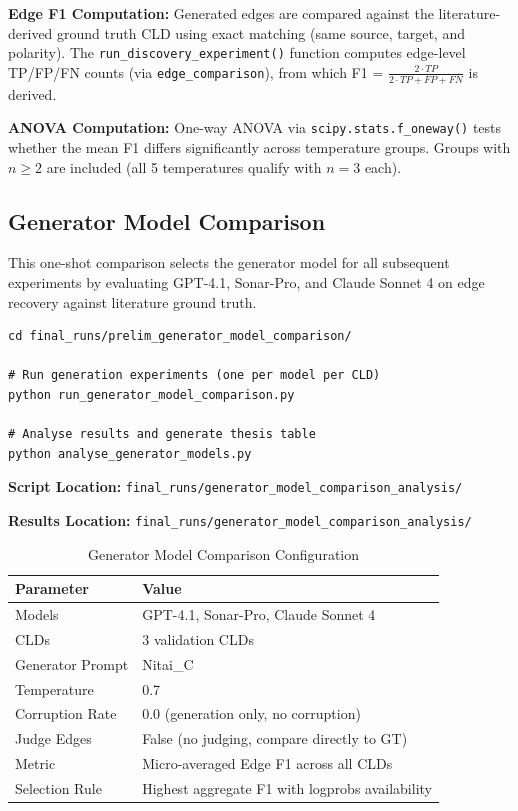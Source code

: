 \textbf{Edge F1 Computation:} Generated edges are compared against the literature-derived ground truth CLD using exact matching (same source, target, and polarity). The \texttt{run\_discovery\_experiment()} function computes edge-level TP/FP/FN counts (via \texttt{edge\_comparison}), from which F1 = $\frac{2 \cdot TP}{2 \cdot TP + FP + FN}$ is derived.

\textbf{ANOVA Computation:} One-way ANOVA via \texttt{scipy.stats.f\_oneway()} tests whether the mean F1 differs significantly across temperature groups. Groups with $n \geq 2$ are included (all 5 temperatures qualify with $n=3$ each).

\subsection{Generator Model Comparison}
\label{sec:generator_comparison}

This one-shot comparison selects the generator model for all subsequent experiments by evaluating GPT-4.1, Sonar-Pro, and Claude Sonnet 4 on edge recovery against literature ground truth.

\begin{verbatim}
cd final_runs/prelim_generator_model_comparison/

# Run generation experiments (one per model per CLD)
python run_generator_model_comparison.py

# Analyse results and generate thesis table
python analyse_generator_models.py
\end{verbatim}

\textbf{Script Location:} \texttt{final\_runs/generator\_model\_comparison\_analysis/}

\textbf{Results Location:} \texttt{final\_runs/generator\_model\_comparison\_analysis/}

\begin{table}[H]
\centering
\caption{Generator Model Comparison Configuration}
\label{tab:generator_comparison_config}
\footnotesize
\begin{tabular}{@{}ll@{}}
\toprule
\textbf{Parameter} & \textbf{Value} \\
\midrule
Models & GPT-4.1, Sonar-Pro, Claude Sonnet 4 \\
CLDs & 3 validation CLDs \\
Generator Prompt & Nitai\_C \\
Temperature & 0.7 \\
Corruption Rate & 0.0 (generation only, no corruption) \\
Judge Edges & False (no judging, compare directly to GT) \\
\midrule
Metric & Micro-averaged Edge F1 across all CLDs \\
Selection Rule & Highest aggregate F1 with logprobs availability \\
\bottomrule
\end{tabular}
\end{table}

